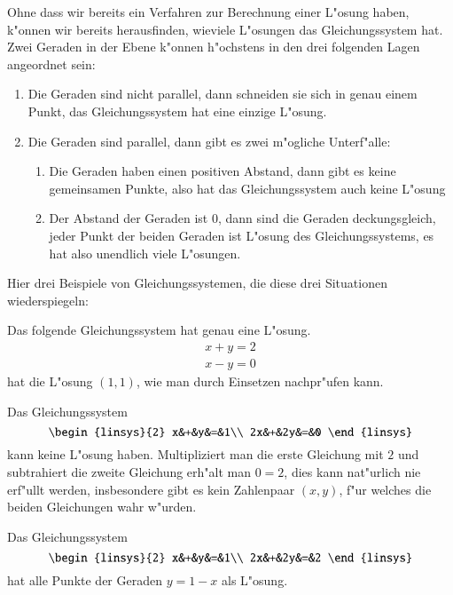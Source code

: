 Ohne dass wir bereits ein Verfahren zur Berechnung einer
L"osung haben, k"onnen wir bereits herausfinden, wieviele
L"osungen das Gleichungssystem hat.
Zwei Geraden in der Ebene
k"onnen h"ochstens in den drei folgenden Lagen angeordnet sein:
\begin{enumerate}
\item Die Geraden sind nicht parallel, dann schneiden sie sich in
genau einem Punkt, das Gleichungssystem hat eine einzige L"osung.
\item Die Geraden sind parallel, dann gibt es zwei m"ogliche Unterf"alle:
\begin{enumerate}
\item Die Geraden haben einen positiven Abstand, dann gibt es keine
gemeinsamen Punkte, also hat das Gleichungssystem auch keine L"osung
\item Der Abstand der Geraden ist $0$, dann sind die Geraden deckungsgleich,
jeder Punkt der beiden Geraden ist L"osung des Gleichungssystems, es hat
also unendlich viele L"osungen.
\end{enumerate}
\end{enumerate}
Hier drei Beispiele von Gleichungssystemen, die diese drei Situationen
wiederspiegeln:
\begin{beispiel}
Das folgende Gleichungssystem hat genau eine L"osung.
\begin{align*}
x+y=2\\
x-y=0
\end{align*}
hat die L"osung $(1,1)$, wie man durch Einsetzen nachpr"ufen kann.
\end{beispiel}
\begin{beispiel}
Das Gleichungssystem
\[
\begin{linsys}{2}
x&+&y&=&1\\
2x&+&2y&=&0
\end{linsys}
\]
kann keine L"osung haben.
Multipliziert man die erste Gleichung mit $2$
und subtrahiert die zweite Gleichung erh"alt man $0=2$, dies kann nat"urlich
nie erf"ullt werden, insbesondere gibt es kein Zahlenpaar $(x,y)$, f"ur
welches die beiden Gleichungen wahr w"urden.
\end{beispiel}
\begin{beispiel}
Das Gleichungssystem
\[
\begin{linsys}{2}
x&+&y&=&1\\
2x&+&2y&=&2
\end{linsys}
\]
hat alle Punkte der Geraden $y=1-x$ als L"osung.
\end{beispiel}

